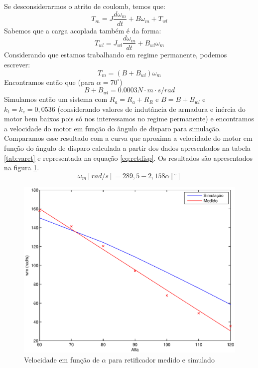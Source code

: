 \documentclass{article}
\begin{document}
Se desconsiderarmos o atrito de coulomb, temos que:
\begin{equation}
	T_m = J\frac{d\omega_m}{dt} + B\omega_m + T_{wl}
\end{equation}
Sabemos que a carga acoplada também é da forma:
\begin{equation}
	T_{wl} = J_{wl}\frac{d\omega_m}{dt} + B_{wl}\omega_m
\end{equation}
Considerando que estamos trabalhando em regime permanente, podemos escrever:
\begin{equation}
T_m = (B + B_{wl})\omega_m
\end{equation}
Encontramos então que (para $\alpha = 70^\circ$)
\begin{equation}
	B + B_{wl} = 0.0003 N\cdot m\cdot s/rad
\end{equation}
Simulamos então um sistema com $R_a = R_a + R_R$ e $B = B + B_{wl}$ e $k_t = k_e = 0,0536$ (considerando valores de indutância de armadura e inércia do motor bem baixos pois só nos interessamos no regime permanente) e encontramos a velocidade do motor em função do ângulo de disparo para simulação. Comparamos esse resultado com a curva que aproxima a velocidade do motor em função do ângulo de disparo calculada a partir dos dados apresentados na tabela \ref{tab:varet} e representada na equação \ref{eq:retdisp}. Os resultados são apresentados na figura \ref{fig:retalfa}.
\begin{equation}
	\omega_m [rad/s] = 289,5 - 2,158 \alpha [^\circ]
	\label{eq:retdisp}
\end{equation}

\begin{figure} [H]
	\centering
	\includegraphics[width=\linewidth]{Dados/Retificador/walfa}
	\caption{Velocidade em função de $\alpha$ para retificador medido e simulado}
	\label{fig:retalfa}
\end{figure}
\end{document}
